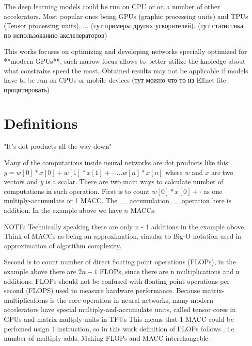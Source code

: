 The deep learning models could be run on CPU or on a number of other accelerators. Most popular ones being GPUs (graphic processing units) and TPUs (Tensor processing units), ... (тут примеры других ускорителей). (тут статистика по использованию акслелераторов)

This works focuses on optimizing and developing networks specially optimized for **modern GPUs**, such narrow focus allows to better utilize the knoledge about what constrains speed the most. Obtained results may not be applicable if models have to be run on CPUs or mobile devices (тут можно что-то из Effnet lite процитировать)


\section{Definitions}

"It’s dot products all the way down" 

Many of the computations inside neural networks are dot products like this: $y = w[0]*x[0] + w[1]*x[1] + \cdots \ldots w[n] * x[n]$ where $w$ and $x$ are two vectors and $y$ is a scalar. There are two main ways to calculate number of computations in such operation. First is to count $ w[0] * x[0] + \cdot $ as one multiply-accumulate or 1 MACC. The __accumulation__ operation here is addition. In the example above we have $n$ MACCs. 


NOTE: 
Technically speaking there are only n - 1 additions in the example above. Think of MACCs as being an approximation, simular to Big-O notation used in approximation of algorithm complexity.

Second is to count number of direct floating point operations (FLOPs), in the example above there are $2n - 1$ FLOPs, since there are n multiplications and n additions. FLOPs should not be confused with floating point operations per second (FLOPS) used to measure hardware performance. Because matrix-multiplications is the core operation in neural networks, many modern accelerators have special multiply-and-accumulate units, called tensor cores 
in GPUs and matrix multply units in TPUs %
This means that 1 MACC could be perfomed usign 1 instruction, so in this work definition of FLOPs follows \cite{zhang2018shufflenet}, i.e. number of multiply-adds. Making FLOPs and MACC interchangeble.

